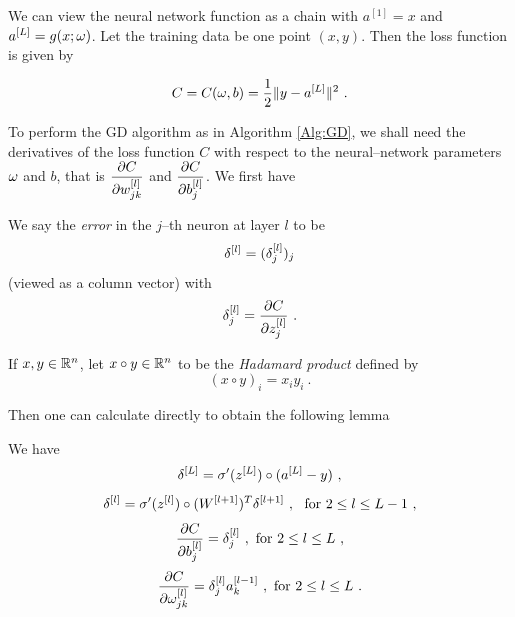 We can view the neural network function as a chain with $a^{[1]}=x$ and $a^{[L]}=g(x;\omega)$.
Let the training data be one point $(x,y)$. Then the loss function is given by

$$C=C(\omega, b)=\dfrac{1}{2}\|y-a^{[L]}\|^2 \ .$$


To perform the GD algorithm as in Algorithm \ref{Alg:GD}, we shall need the derivatives of the loss function $C$ with respect
to the neural--network parameters $\omega$ and $b$, that is $\dfrac{\partial C}{\partial w^{[l]}_{jk}}$ and $\dfrac{\partial C}{\partial b_j^{[l]}}$. We first have

\begin{definition}\label{Def:ErrorNNBackPropagation} 
We say the \emph{error} in the $j$--th neuron at layer $l$ to be $$\delta^{[l]}=(\delta_j^{[l]})_j$$
(viewed as a column vector) with
$$\dt_j^{[l]}=\dfrac{\pt C}{\pt z_j^{[l]}} \ .$$
\end{definition}

\begin{definition}\label{Def:HadamadProduct}
If $x,y\in \mathbb R^n$, let $x\circ y\in \mathbb R^n$ to be the \emph{Hadamard product}
defined by $$(x\circ y)_i=x_iy_i \ .$$ 
\end{definition}

Then one can calculate directly to obtain the following lemma

\begin{lemma}\label{Lm:BackPropagation}
We have
\begin{equation}\label{Lm:BackPropagation:Eq:deltaL}
\delta^{[L]}=\sigma'(z^{[L]})\circ (a^{[L]}-y) \ ,
\end{equation}
\begin{equation}\label{Lm:BackPropagation:Eq:deltal}
\delta^{[l]}=\sigma'(z^{[l]})\circ (W^{[l+1]})^T \delta^{[l+1]} \ , \ \text{ for } 2\leq l \leq L-1 \ ,
\end{equation}
\begin{equation}\label{Lm:BackPropagation:Eq:CPartialb}
\dfrac{\partial C}{\partial b_j^{[l]}}=\delta_j^{[l]} \ , \text{ for } 2\leq l \leq L \ ,
\end{equation}
\begin{equation}\label{Lm:BackPropagation:Eq:CPartialomega}
\dfrac{\partial C}{\partial \omega_{jk}^{[l]}}=\delta_j^{[l]}a_k^{[l-1]} \ , \text{ for } 2\leq l \leq L \ .
\end{equation}
\end{lemma}

